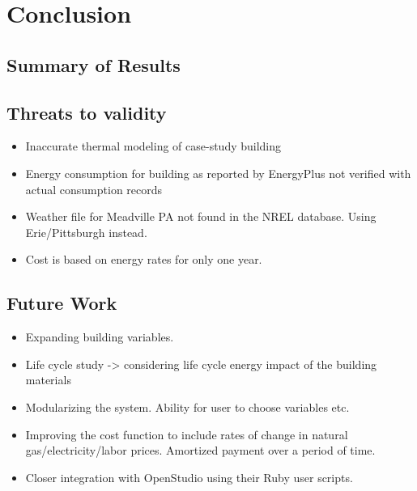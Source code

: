 %
%
%

\chapter{Conclusion}\label{ch:conclusion}

\section{Summary of Results}

\section{Threats to validity}
\begin{itemize}
	\item Inaccurate thermal modeling of case-study building
	\item Energy consumption for building as reported by EnergyPlus not verified with actual consumption records
	\item Weather file for Meadville PA not found in the NREL database. Using Erie/Pittsburgh instead.
	\item Cost is based on energy rates for only one year. 
\end{itemize}

\section{Future Work}

\begin{itemize}
	\item Expanding building variables.
	\item Life cycle study -> considering life cycle energy impact of the building materials
	\item Modularizing the system. Ability for user to choose variables etc.
	\item Improving the cost function to include rates of change in natural gas/electricity/labor prices. Amortized payment over a period of time.
	\item Closer integration with OpenStudio using their Ruby user scripts.
\end{itemize}